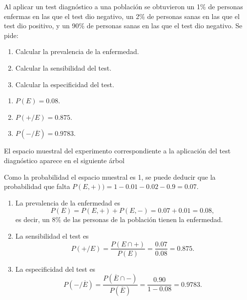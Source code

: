 {Al aplicar un test diagnóstico a una población se obtuvieron un 1\% de personas enfermas en las que el test dio negativo, un 2\% de
personas sanas en las que el test dio positivo, y un 90\% de personas sanas en las que el test dio negativo.  
Se pide:
\begin{enumerate}
\item Calcular la prevalencia de la enfermedad.
\item Calcular la sensibilidad del test.
\item Calcular la especificidad del test.
\end{enumerate} 
} 
{\begin{enumerate}
\item $P(E)=0.08$.
\item $P(+/E) = 0.875$.
\item $P(-/\overline{E})= 0.9783$.
\end{enumerate}
}
{El espacio muestral del experimento correspondiente a la aplicación del test diagnóstico aparece en el siguiente árbol

Como la probabilidad el espacio muestral es 1, se puede deducir que la probabilidad que falta $P(E,+))= 1- 0.01 -0.02 -0.9 = 0.07$.

\begin{enumerate}
\item La prevalencia de la enfermedad es 
\[
P(E) = P(E,+)+P(E,-) = 0.07 + 0.01 = 0.08,
\]
es decir, un 8\% de las personas de la población tienen la enfermedad.

\item La sensibilidad el test es
\[
P(+/E) = \frac{P(E\cap +)}{P(E)} = \frac{0.07}{0.08} = 0.875.
\]

\item La especificidad del test es 
\[
P(-/\overline{E}) = \frac{P(\overline E\cap -)}{P(\overline E)} = \frac{0.90}{1-0.08} = 0.9783.
\]
\end{enumerate}
}



